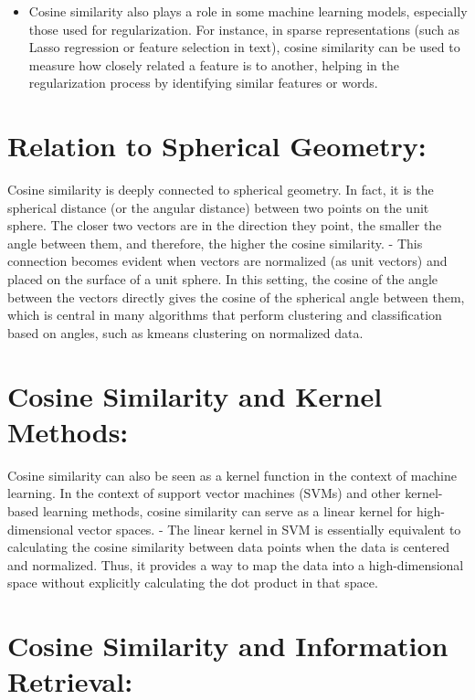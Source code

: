 \documentclass[
  12 pt,
  a4paper,
]{book}
\providecommand{\tightlist}{%
  \setlength{\itemsep}{0pt}\setlength{\parskip}{0pt}}
\numberwithin{equation}{section}
\theoremstyle{plain}      %
\theoremstyle{definition} %
\theoremstyle{remark}     %
\theoremstyle{note}         %
\begin{document}
\begin{itemize}
\tightlist
\item
  Cosine similarity also plays a role in some machine learning models,
  especially those used for regularization. For instance, in sparse
  representations (such as Lasso regression or feature selection in
  text), cosine similarity can be used to measure how closely related a
  feature is to another, helping in the regularization process by
  identifying similar features or words.
\end{itemize}

\hypertarget{relation-to-spherical-geometry}{%
\section{Relation to Spherical
Geometry:}\label{relation-to-spherical-geometry}}

Cosine similarity is deeply connected to spherical geometry. In fact, it
is the spherical distance (or the angular distance) between two points
on the unit sphere. The closer two vectors are in the direction they
point, the smaller the angle between them, and therefore, the higher the
cosine similarity. - This connection becomes evident when vectors are
normalized (as unit vectors) and placed on the surface of a unit sphere.
In this setting, the cosine of the angle between the vectors directly
gives the cosine of the spherical angle between them, which is central
in many algorithms that perform clustering and classification based on
angles, such as kmeans clustering on normalized data.

\hypertarget{cosine-similarity-and-kernel-methods}{%
\section{Cosine Similarity and Kernel
Methods:}\label{cosine-similarity-and-kernel-methods}}

Cosine similarity can also be seen as a kernel function in the context
of machine learning. In the context of support vector machines (SVMs)
and other kernel-based learning methods, cosine similarity can serve as
a linear kernel for high-dimensional vector spaces. - The linear kernel
in SVM is essentially equivalent to calculating the cosine similarity
between data points when the data is centered and normalized. Thus, it
provides a way to map the data into a high-dimensional space without
explicitly calculating the dot product in that space.

\hypertarget{cosine-similarity-and-information-retrieval}{%
\section{Cosine Similarity and Information
Retrieval:}\label{cosine-similarity-and-information-retrieval}}
\end{document}
